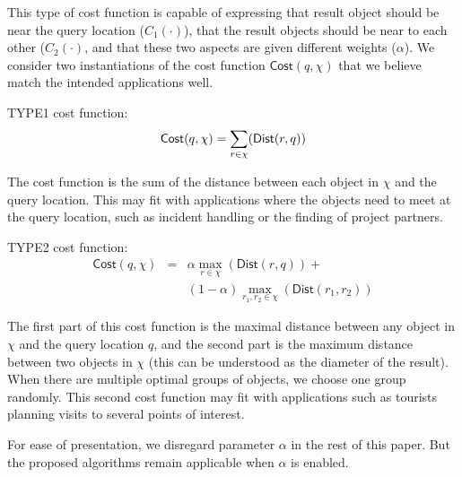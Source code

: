 \documentclass{sig-alternate}
\begin{document}
This type of cost function is capable of expressing that result
object should be near the query location ($C_1(\cdot)$), that the
result objects should be near to each other ($C_2(\cdot)$, and that
these two aspects are given different weights ($\alpha$).
%
We consider two instantiations of the cost function
$\mathsf{Cost}(q,\chi)$ that we believe match the intended
applications well.

\noindent \textsc{TYPE1} cost function:\vspace{-1ex}
%
\begin{equation}\vspace{-1ex}
\mathsf{Cost}(q,\chi) = \sum_{r \in \chi}(\mathsf{Dist}(r, q))
\end{equation}\vspace{-1ex}

The cost function is the sum of the distance between each object in
$\chi$ and the query location. This may fit with applications where
the objects need to meet at the query location, such as incident
handling or the finding of project partners.

\noindent \textsc{TYPE2} cost function:\vspace{-1ex}
%
\begin{eqnarray}
\mathsf{Cost}(q,\chi) & = & \alpha\max_{r \in \chi}(\mathsf{Dist}(r,
q)) +
\\ & & (1 - \alpha) \max_{r_1, r_2 \in \chi}(\mathsf{Dist}(r_1, r_2)) \nonumber
\end{eqnarray}\vspace{-2ex}

The first part of this cost function is the maximal
distance between any object in $\chi$ and the query location $q$,
and the second part is the maximum distance between two objects in
$\chi$ (this can be understood as the diameter of the result).
%
When there are multiple optimal groups of objects, we choose one
group randomly. This second cost function may fit with applications
such as tourists planning visits to several points of interest.

For ease of presentation, we disregard parameter $\alpha$ in the
rest of this paper. But the proposed algorithms remain
applicable when $\alpha$ is enabled.
\end{document}
